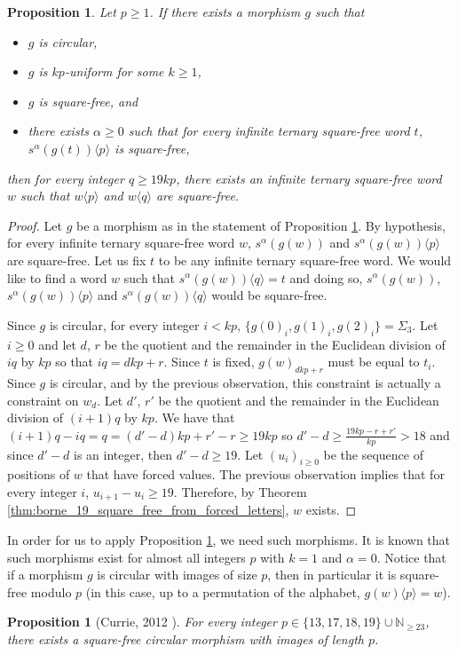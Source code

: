 \documentclass[12pt]{article}
\newtheorem{proposition}[theorem]{Proposition}
\theoremstyle{definition}
\newcommand{\subsequence}[2]{#1\langle#2\rangle}
\begin{document}
\begin{proposition}\label{prop:circular_morphism_sf_sfmodp}
    Let $p \ge 1$. If there exists a morphism $g$ such that 
    \begin{itemize}
        \item $g$ is circular,
        \item $g$ is $kp$-uniform for some $k \ge 1$,  
        \item $g$ is square-free, and
        \item there exists $\alpha \ge 0$ such that for every infinite ternary square-free word $t$, $\subsequence{s^\alpha(g(t))}{p}$ is square-free,
    \end{itemize}
    then for every integer $q \ge 19kp$, 
    there exists an infinite ternary square-free word $w$ such that $\subsequence{w}{p}$ and $\subsequence{w}{q}$ are square-free.
\end{proposition}

\begin{proof}
Let $g$ be a morphism as in the statement of Proposition \ref{prop:circular_morphism_sf_sfmodp}.
By hypothesis, for every infinite ternary square-free word $w$, $s^\alpha(g(w))$ and $\subsequence{s^\alpha(g(w))}{p}$ are square-free.
Let us fix $t$ to be any infinite ternary square-free word. We would like to find a word $w$ such that $\subsequence{s^\alpha(g(w))}{q} = t$ and doing so, $s^\alpha(g(w))$, $\subsequence{s^\alpha(g(w))}{p}$ and $\subsequence{s^\alpha(g(w))}{q}$ would be square-free. 

Since $g$ is circular, for every integer $i < kp$, $\{g(0)_i, g(1)_i, g(2)_i\}= \Sigma_3$. Let $i \ge 0$ and let $d$, $r$ be the quotient and the remainder in the Euclidean division of $iq$ by $kp$ so that $iq = dkp + r$. Since $t$ is fixed, $g(w)_{dkp + r}$ must be equal to $t_i$. Since $g$ is circular, and by the previous observation, this constraint is actually a constraint on $w_d$. Let $d'$, $r'$ be the quotient and the remainder in the Euclidean division of $(i + 1)q$ by $kp$. We have that $(i + 1)q - iq = q = (d' - d)kp + r' - r \ge 19kp$ so $d' - d \geq \frac{19kp - r + r'}{kp} > 18$ and since $d' - d$ is an integer, then $d' - d \geq 19$. Let $(u_i)_{i \ge 0}$ be the sequence of positions of $w$ that have forced values. The previous observation implies that for every integer $i$, $u_{i + 1} - u_i \ge 19$. Therefore, by Theorem \ref{thm:borne_19_square_free_from_forced_letters}, $w$ exists.
\end{proof}


In order for us to apply Proposition \ref{prop:circular_morphism_sf_sfmodp}, we need such morphisms. It is known that such morphisms exist for almost all integers $p$ with $k = 1$ and $\alpha = 0$. Notice that if a morphism $g$ is circular with images of size $p$, then in particular it is square-free modulo $p$ (in this case, up to a permutation of the alphabet, $\subsequence{g(w)}{p}=w$).
\begin{proposition}[Currie, 2012 \cite{currie2012infinite}]\label{prop:currie2021infinite}
    For every integer $p \in \{13, 17, 18, 19\} \cup \mathbb{N}_{\ge 23}$, there exists a square-free circular morphism with images of length $p$.
\end{proposition}
\end{document}
